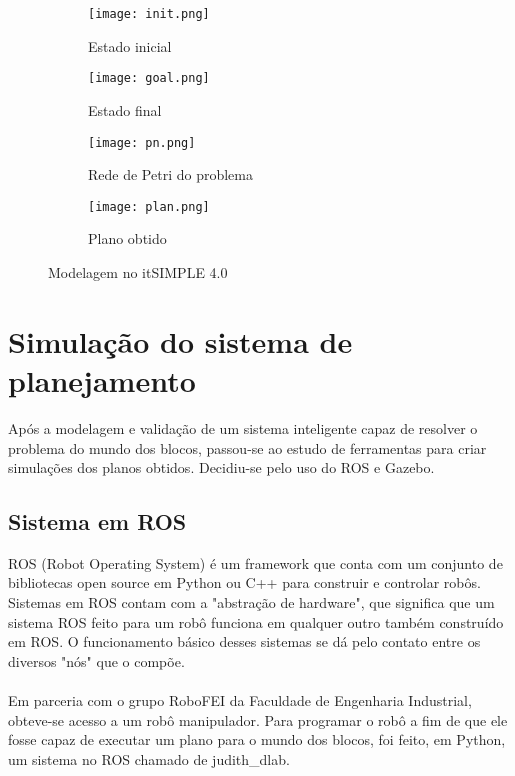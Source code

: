 \documentclass[12pt,titlepage]{article}
\begin{document}
\newpage
	\begin{figure}[H]
	  \centering
	  \begin{subfigure}[b]{0.3\linewidth}
	    \texttt{[image: init.png]}
	     \caption{Estado inicial}
	  \end{subfigure}
	  \begin{subfigure}[b]{0.3\linewidth}
	    \texttt{[image: goal.png]}
	    \caption{Estado final}
	  \end{subfigure}
		\begin{subfigure}[b]{0.8\linewidth}
			\texttt{[image: pn.png]}
			\caption{Rede de Petri do problema}
		\end{subfigure}
		\begin{subfigure}[b]{0.5\linewidth}
			\texttt{[image: plan.png]}
			\caption{Plano obtido}
		\end{subfigure}
		\caption{Modelagem no itSIMPLE 4.0}

	\end{figure}

\section{Simulação do sistema de planejamento}

	Após a modelagem e validação de um sistema inteligente capaz de resolver o problema do mundo dos blocos, passou-se ao estudo de ferramentas para criar simulações dos planos obtidos. Decidiu-se pelo uso do ROS e Gazebo.

\subsection{Sistema em ROS}

	ROS (Robot Operating System) é um framework que conta com um conjunto de bibliotecas open source em Python ou C++ para construir e controlar robôs. Sistemas em ROS contam com a "abstração de hardware", que significa que um sistema ROS feito para um robô funciona em qualquer outro também construído em ROS. O funcionamento básico desses sistemas se dá pelo contato entre os diversos "nós" que o compõe.\cite{ros}
	\paragraph{}

	Em parceria com o grupo RoboFEI da Faculdade de Engenharia Industrial, obteve-se acesso a um robô manipulador. Para programar o robô a fim de que ele fosse capaz de executar um plano para o mundo dos blocos, foi feito, em Python, um sistema no ROS chamado de judith\_dlab.
\end{document}
